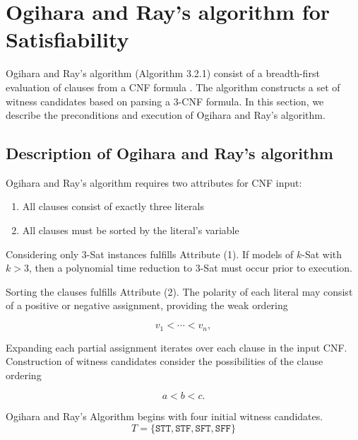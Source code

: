 \section{Ogihara and Ray's algorithm for {\sc Satisfiability}}


Ogihara and Ray's algorithm (Algorithm 3.2.1) consist of a breadth-first evaluation of clauses from a CNF formula \cite{Ogihara:1996:BFS:898228,Ogihara97dna-basedparallel}.  The algorithm constructs a set of witness candidates based on parsing a 3-CNF formula.  In this section, we describe the preconditions and execution of Ogihara and Ray's algorithm.

\subsection{Description of Ogihara and Ray's algorithm}
		
Ogihara and Ray's algorithm requires two attributes for CNF input:

\begin{enumerate}
\item All clauses consist of exactly three literals
\item All clauses must be sorted by the literal's variable
\end{enumerate}

Considering only $3$-{\sc Sat} instances fulfills Attribute (1).  If models of $k$-{\sc Sat} with $k > 3$, then a polynomial time reduction to $3$-{\sc Sat} must occur prior to execution.

Sorting the clauses fulfills Attribute (2).  The polarity of each literal may consist of a positive or negative assignment, providing the weak ordering

\[
v_1 < \cdots < v_n,
\]



\FloatBarrier

Expanding each partial assignment iterates over each clause in the input CNF.  Construction of witness candidates consider the possibilities of the clause ordering

\[
a < b < c.
\]


{\sc Ogihara and Ray's Algorithm} begins with four initial witness candidates. 
\[
T = \{ \texttt{STT}, \texttt{STF}, \texttt{SFT}, \texttt{SFF}\}
\]

